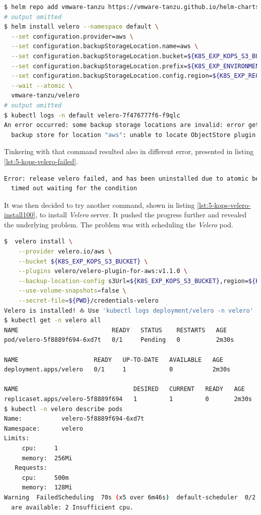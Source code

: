 \begin{lstlisting}[basicstyle=\scriptsize,xleftmargin=0cm,label=lst:5-kops-install-velero-ts,caption={Installing \textit{Velero} server},captionpos=b,language=Bash]
$ helm repo add vmware-tanzu https://vmware-tanzu.github.io/helm-charts
# output omitted
$ helm install velero --namespace default \
  --set configuration.provider=aws \
  --set configuration.backupStorageLocation.name=aws \
  --set configuration.backupStorageLocation.bucket=${K8S_EXP_KOPS_S3_BUCKET} \
  --set configuration.backupStorageLocation.prefix=${K8S_EXP_ENVIRONMENT} \
  --set configuration.backupStorageLocation.config.region=${K8S_EXP_REGION} \
  --wait --atomic \
  vmware-tanzu/velero
# output omitted
$ kubectl logs -n default velero-7f476777f6-f9qlc
An error occurred: some backup storage locations are invalid: error getting\
  backup store for location "aws": unable to locate ObjectStore plugin named velero.io/aws
\end{lstlisting}

Tinkering with that command resulted also in different error, presented in listing \ref{lst:5-kops-velero-failed}.
\begin{lstlisting}[basicstyle=\scriptsize,xleftmargin=0cm,label=lst:5-kops-velero-failed,caption={\textit{Velero} server installation error},captionpos=b,language=Bash]
Error: release velero failed, and has been uninstalled due to atomic being set:\
  timed out waiting for the condition
\end{lstlisting}

It was then decided to try another command, shown in listing \ref{lst:5-kops-velero-install100}, to install \textit{Velero} server. It pushed the progress further and revealed the underlying problem. The problem was with scheduling the \textit{Velero} pod.
\begin{lstlisting}[basicstyle=\scriptsize,xleftmargin=0cm,label=lst:5-kops-velero-install100,caption={Another attempt to deploy \textit{Velero} server},captionpos=b,language=Bash]
$  velero install \
    --provider velero.io/aws \
    --bucket ${K8S_EXP_KOPS_S3_BUCKET} \
    --plugins velero/velero-plugin-for-aws:v1.1.0 \
    --backup-location-config s3Url=${K8S_EXP_KOPS_S3_BUCKET},region=${K8S_EXP_REGION} \
    --use-volume-snapshots=false \
    --secret-file=${PWD}/credentials-velero
Velero is installed! ⛵ Use 'kubectl logs deployment/velero -n velero' to view the status.
$ kubectl get -n velero all
NAME                          READY   STATUS    RESTARTS   AGE
pod/velero-5f8889f694-6xd7t   0/1     Pending   0          2m30s

NAME                     READY   UP-TO-DATE   AVAILABLE   AGE
deployment.apps/velero   0/1     1            0           2m30s

NAME                                DESIRED   CURRENT   READY   AGE
replicaset.apps/velero-5f8889f694   1         1         0       2m30s
$ kubectl -n velero describe pods
Name:           velero-5f8889f694-6xd7t
Namespace:      velero
Limits:
     cpu:     1
     memory:  256Mi
   Requests:
     cpu:     500m
     memory:  128Mi
Warning  FailedScheduling  70s (x5 over 6m46s)  default-scheduler  0/2 nodes\
  are available: 2 Insufficient cpu.
\end{lstlisting}

